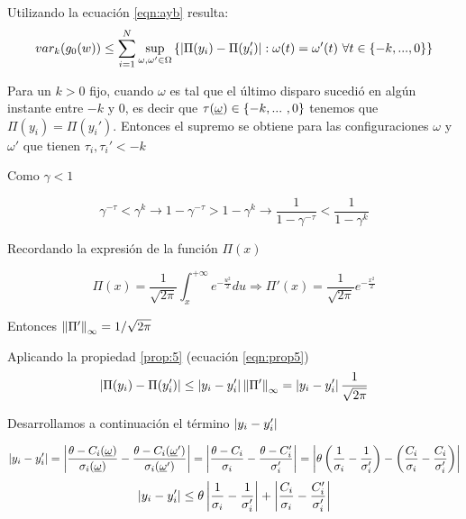 Utilizando la ecuación \eqref{eqn:ayb} resulta:
\begin{equation}
    var_k(g_0(w)) \leq \sum_{i=1}^N \sup_{\omega,\omega' \in \Omega} \left\{ \left|\Pi(y_i)-\Pi(y_i')\right| : \omega(t)=\omega'(t) \ \forall t \in \{-k, ... ,0\}\right\}
    \label{eqn:varg0}
\end{equation}

Para un $k>0$ fijo, cuando $\omega$ es tal que el último disparo sucedió en algún instante entre $-k$ y $0$, es decir que $\tau(\underline{\omega}) \in \{-k, ... \ , 0 \}$ tenemos que $\Pi(y_i) = \Pi(y_i')$. Entonces el supremo se obtiene para las configuraciones $\omega$ y $\omega'$ que tienen $\tau_i,\tau_i' < -k$

Como $\gamma < 1$

\begin{equation}
  \gamma^{-\tau}<\gamma^k \longrightarrow 1-\gamma^{-\tau}> 1-\gamma^k \longrightarrow \frac{1}{1-\gamma^{-\tau}} < \frac{1}{1-\gamma^k}
  \label{eqn:desigualdadgamma}
\end{equation}

Recordando la expresión de la función $\Pi(x)$

\begin{equation}
    \Pi(x)=\frac{1}{\sqrt{2\pi}} \int_x^{+\infty} e^{-\frac{u^2}{2}} du \Longrightarrow \Pi'(x)=\frac{1}{\sqrt{2\pi}} e^{-\frac{x^2}{2}}
\end{equation}

Entonces $\left\lVert\Pi'\right\rVert_{\infty} = 1/\sqrt{2 \pi}$

Aplicando la propiedad \ref{prop:5} (ecuación \eqref{eqn:prop5})
\begin{equation}
    \left|\Pi(y_i) - \Pi(y_i')\right| \leq \left|y_i - y_i'\right| \left\lVert\Pi'\right\rVert_{\infty} = \left|y_i - y_i'\right| \frac{1}{\sqrt{2 \pi}}
    \label{eqn:derivada}
\end{equation}

Desarrollamos a continuación el término $\left|y_i - y_i'\right|$

\begin{equation*}
    \left|y_i - y_i'\right| = \left|\frac{\theta - C_i(\underline{\omega})}{\sigma_i(\underline{\omega})} - 
    \frac{\theta - C_i(\underline{\omega}')}{\sigma_i(\underline{\omega}')}\right|
    = \left|\frac{\theta - C_i}{\sigma_i} - \frac{\theta - C_i'}{\sigma_i'}\right|
    = \left|\theta\left( \frac{1}{\sigma_i} - \frac{1}{\sigma_i'} \right)  - \left( \frac{C_i}{\sigma_i} - \frac{C_i}{\sigma_i'} \right) \right|
\end{equation*}
\begin{equation}
    \left|y_i - y_i'\right| \leq \theta \left|\frac{1}{\sigma_i} - \frac{1}{\sigma_i'}\right| + 
    \left|\frac{C_i}{\sigma_i} - \frac{C_i'}{\sigma_i'}\right|
    \label{eqn:diffys}
\end{equation}


